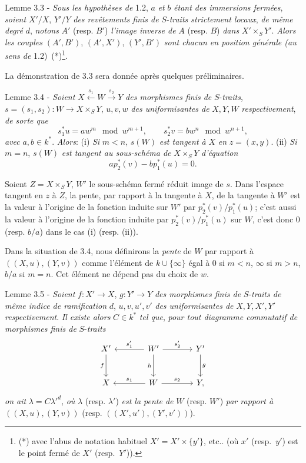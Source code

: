 \begin{statement}{Lemme 3.3 -}
\emph{Sous les hypothèses de} 1.2, $a$ \emph{et} $b$ \emph{étant des immersions fermées}, \emph{soient} $X'/X$, $Y'/Y$ \emph{des revêtements finis de} $S$-\emph{traits strictement locaux}, \emph{de même degré} $d$, \emph{notons} $A'$ (resp. $B'$) \emph{l'image inverse de} $A$ (resp. $B$) \emph{dans} $X'\times_S Y'$. \emph{Alors les couples} $(A',B')$, $(A',X')$, $(Y',B')$ \emph{sont chacun en position générale (au sens de} 1.2)~(*)\footnote{(*) avec l'abus de notation habituel $X'=X'\times\{y'\}$, etc.. (où $x'$ (resp.\ $y'$) est le point fermé de $X'$ (resp.\ $Y'$)).}.
\end{statement}

La démonstration de 3.3 sera donnée après quelques préliminaires.

\begin{statement}{Lemme 3.4 -}
\emph{Soient} $X\xleftarrow{s_1}W\xrightarrow{s_2}Y$ \emph{des morphismes finis de} $S$-\emph{traits}, $s=(s_1,s_2):W\to X\times_SY$, $u,v,w$ \emph{des uniformisantes de} $X,Y,W$ \emph{respectivement}, \emph{de sorte que}
\[
s_1^*u=aw^m\mod {w^{m+1}},\qquad
s_2^*v=bw^n\mod {w^{n+1}},
\]
\emph{avec} $a,b\in k^*$. \emph{Alors}: (i) \emph{Si} $m<n$, $s(W)$ \emph{est tangent à} $X$ \emph{en} $z=(x,y)$. (ii) \emph{Si} $m=n$, $s(W)$ \emph{est tangent au sous-schéma de} $X\times_SY$ \emph{d'équation}
\[
ap_2^*(v)-bp_1^*(u)=0.
\]
\end{statement}

Soient $Z=X\times_SY$, $W'$ le sous-schéma fermé réduit image de $s$. Dans l'espace tangent en $z$ à $Z$, la pente, par rapport à la tangente à $X$, de la tangente à $W'$ est la valeur à l'origine de la fonction induite sur $W'$ par $p_2^*(v)/p_1^*(u)$; c'est aussi la valeur à l'origine de la fonction induite par $p_2^*(v)/p_1^*(u)$ sur $W$, c'est donc $0$ (resp. $b/a$) dans le cas (i) (resp. (ii)).

Dans la situation de 3.4, nous définirons la \emph{pente} de $W$ par rapport à $((X,u),(Y,v))$ comme l'élément de $k\cup\{\infty\}$ égal à $0$ si $m<n$, $\infty$ si $m>n$, $b/a$ si $m=n$. Cet élément ne dépend pas du choix de $w$.

\begin{statement}{Lemme 3.5 -}
\emph{Soient} $f:X'\to X$, $g:Y'\to Y$ \emph{des morphismes finis de} $S$-\emph{traits de même indice de ramification} $d$, $u,v,u',v'$ \emph{des uniformisantes de} $X,Y,X',Y'$ \emph{respectivement}. \emph{Il existe alors} $C\in k^*$ \emph{tel que}, \emph{pour tout diagramme commutatif de morphismes finis de} $S$-\emph{traits}
\[
\begin{tikzcd}[column sep=large,row sep=large]
X' \arrow[d,"f"'] & W' \arrow[l,"s'_1"'] \arrow[r,"s'_2"] \arrow[d,"h"'] & Y' \arrow[d,"g"]\\
X & W \arrow[l,"s_1"'] \arrow[r,"s_2"] & Y ,
\end{tikzcd}
\]
\emph{on ait} $\lambda=C{\lambda'}^d$, \emph{où} $\lambda$ (resp. $\lambda'$) \emph{est la pente de} $W$ (resp. $W'$) \emph{par rapport à} $((X,u),(Y,v))$ (resp. $((X',u'),(Y',v'))$).
\end{statement}

